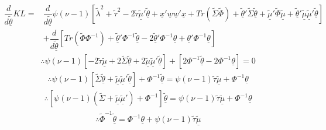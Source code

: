 \documentclass[fleqn]{minimal}
\begin{document}
\begin{align*}
  \dfrac{d}{d\underline{\tilde{\theta}}}KL
  = & \dfrac{d}{d\underline{\tilde{\theta}}}
  \psi\left(\nu-1\right)
  \left[
    \tilde{\lambda}^2 + \tilde{\tau}^2
    - 2\tilde{\tau}\underline{\tilde{\mu}}'\underline{\tilde{\theta}}
    + \underline{x}'\underline{w}\underline{w}'\underline{x}
    + Tr \left( \tilde{\Sigma}\tilde{\Phi}\right)
    + \underline{\tilde{\theta}}'\tilde{\Sigma}\underline{\tilde{\theta}}
    + \underline{\tilde{\mu}}'\tilde{\Phi}\underline{\tilde{\mu}}
    + \underline{\tilde{\theta}}'\underline{\tilde{\mu}}\underline{\tilde{\mu}}'\underline{\tilde{\theta}}
  \right] \\
  &+ \dfrac{d}{d\underline{\tilde{\theta}}}
  \left[
    Tr\left(\tilde{\Phi} \Phi^{-1}\right)
    + \underline{\tilde{\theta}}'\Phi^{-1}\underline{\tilde{\theta}}
    -2 \underline{\tilde{\theta}}' \Phi^{-1}\underline{\theta}
    + \underline{\theta}' \Phi^{-1}\underline{\theta}
  \right]
\end{align*}
\begin{align*}
  \therefore
  \psi\left(\nu-1\right)
  \left[
    - 2 \tilde{\tau}\underline{\tilde{\mu}}
    + 2 \tilde{\Sigma}\underline{\tilde{\theta}}
    + 2 \underline{\tilde{\mu}}\underline{\tilde{\mu}}'\underline{\tilde{\theta}}
  \right]
  + \left[
    2 \Phi^{-1}\underline{\tilde{\theta}}
    -2 \Phi^{-1}\underline{\theta}
  \right]
  = 0
\end{align*}
\begin{align*}
  \therefore
  \psi\left(\nu-1\right)
  \left[
    \tilde{\Sigma}\underline{\tilde{\theta}}
    + \underline{\tilde{\mu}}\underline{\tilde{\mu}}'\underline{\tilde{\theta}}
  \right]
  + \Phi^{-1}\underline{\tilde{\theta}}
  =
  \psi\left(\nu-1\right)
  \tilde{\tau}\underline{\tilde{\mu}}
  + \Phi^{-1}\underline{\theta}
\end{align*}
\begin{align*}
  \therefore
  \left[
    \psi\left(\nu-1\right)
    \left(
      \tilde{\Sigma}
      + \underline{\tilde{\mu}}\underline{\tilde{\mu}}'
    \right)
    + \Phi^{-1}
  \right]\underline{\tilde{\theta}}
  =
  \psi\left(\nu-1\right)
  \tilde{\tau}\underline{\tilde{\mu}}
  + \Phi^{-1}\underline{\theta}
\end{align*}
\begin{align*}
  \therefore
  \tilde{\Phi}^{-1}\underline{\tilde{\theta}}
  =
  \Phi^{-1}\underline{\theta}
  + \psi\left(\nu-1\right)
  \tilde{\tau}\underline{\tilde{\mu}}
\end{align*}
\end{document}
